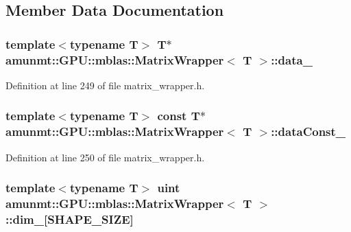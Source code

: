 \subsection{Member Data Documentation}
\subsubsection[{\texorpdfstring{data\+\_\+}{data_}}]{\setlength{\rightskip}{0pt plus 5cm}template$<$typename T$>$ T$\ast$ {\bf amunmt\+::\+G\+P\+U\+::mblas\+::\+Matrix\+Wrapper}$<$ T $>$\+::data\+\_\+\hspace{0.3cm}{\ttfamily [protected]}}\hypertarget{classamunmt_1_1GPU_1_1mblas_1_1MatrixWrapper_ab350c962dc0fc97fcdb2b1e10b0474e9}{}\label{classamunmt_1_1GPU_1_1mblas_1_1MatrixWrapper_ab350c962dc0fc97fcdb2b1e10b0474e9}


Definition at line 249 of file matrix\+\_\+wrapper.\+h.

\subsubsection[{\texorpdfstring{data\+Const\+\_\+}{dataConst_}}]{\setlength{\rightskip}{0pt plus 5cm}template$<$typename T$>$ const T$\ast$ {\bf amunmt\+::\+G\+P\+U\+::mblas\+::\+Matrix\+Wrapper}$<$ T $>$\+::data\+Const\+\_\+\hspace{0.3cm}{\ttfamily [protected]}}\hypertarget{classamunmt_1_1GPU_1_1mblas_1_1MatrixWrapper_a2b562e025bf15e9df43c2db85b4e9ee2}{}\label{classamunmt_1_1GPU_1_1mblas_1_1MatrixWrapper_a2b562e025bf15e9df43c2db85b4e9ee2}


Definition at line 250 of file matrix\+\_\+wrapper.\+h.

\subsubsection[{\texorpdfstring{dim\+\_\+}{dim_}}]{\setlength{\rightskip}{0pt plus 5cm}template$<$typename T$>$ uint {\bf amunmt\+::\+G\+P\+U\+::mblas\+::\+Matrix\+Wrapper}$<$ T $>$\+::dim\+\_\+\mbox{[}{\bf S\+H\+A\+P\+E\+\_\+\+S\+I\+ZE}\mbox{]}\hspace{0.3cm}{\ttfamily [protected]}}\hypertarget{classamunmt_1_1GPU_1_1mblas_1_1MatrixWrapper_a3a215de9912888c405dbce53470c00cf}{}\label{classamunmt_1_1GPU_1_1mblas_1_1MatrixWrapper_a3a215de9912888c405dbce53470c00cf}


